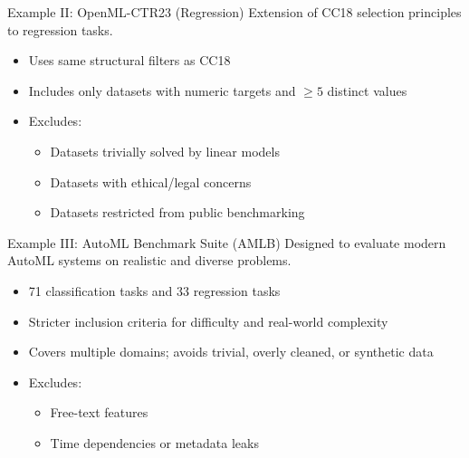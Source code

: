 \documentclass[11pt,compress,t,notes=noshow, aspectratio=169, xcolor=table]{beamer}
\begin{document}
\begin{vbframe}{Example II: OpenML-CTR23 (Regression)}
\vfill
Extension of CC18 selection principles to regression tasks.
\vspace{0.5em}
\begin{itemize}
    \item Uses same structural filters as CC18
    \item Includes only datasets with numeric targets and $\geq 5$ distinct values
    \item Excludes:
    \begin{itemize}
        \item Datasets trivially solved by linear models
        \item Datasets with ethical/legal concerns
        \item Datasets restricted from public benchmarking
    \end{itemize}
\end{itemize}
\vfill
\end{vbframe}

\begin{vbframe}{Example III: AutoML Benchmark Suite (AMLB)}
\vfill
Designed to evaluate modern AutoML systems on realistic and diverse problems.
\vspace{0.5em}
\begin{itemize}
    \item 71 classification tasks and 33 regression tasks
    \item Stricter inclusion criteria for difficulty and real-world complexity
    \item Covers multiple domains; avoids trivial, overly cleaned, or synthetic data
    \item Excludes:
    \begin{itemize}
        \item Free-text features
        \item Time dependencies or metadata leaks
    \end{itemize}
\end{itemize}
\vfill
\end{vbframe}


\end{document}
